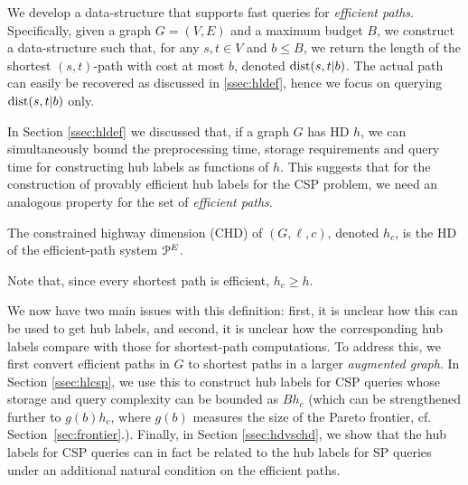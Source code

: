 We develop a data-structure that supports fast queries for \emph{efficient paths}. 
Specifically, given a graph $G=(V,E)$ and a maximum budget $B$, we construct a data-structure such that, for any $s,t\in V$ and $b\leq B$, we return the length of the shortest $(s,t)$-path with cost at most $b$, denoted $\mbox{dist}(s,t|b)$.
The actual path can easily be recovered as discussed in \cref{ssec:hldef}, hence we focus on querying $\mbox{dist}(s,t|b)$ only.

In Section \ref{ssec:hldef} we discussed that, if a graph $G$ has HD $h$, we can simultaneously bound the preprocessing time, storage requirements and query time for constructing hub labels as functions of $h$.
This suggests that for the construction of provably efficient hub labels for the CSP problem, we need an analogous property for the set of \emph{efficient paths}.
\begin{definition} The constrained highway dimension (CHD) of $(G,\ell,c)$, denoted $h_c$, is the HD of the efficient-path system $\mathcal{P}^E$.
\end{definition}
Note that, since every shortest path is efficient, $h_c\geq h$.

We now have two main issues with this definition: first, it is unclear how this can be used to get hub labels, and second, it is unclear how the corresponding hub labels compare with those for shortest-path computations. 
To address this, we first convert efficient paths in $G$ to shortest paths in a larger \emph{augmented graph}. 
In Section \ref{ssec:hlcsp}, we use this to construct hub labels for CSP queries whose storage and query complexity can be bounded as $Bh_c$ (which can be strengthened further to $g(b)h_c$, where $g(b)$ measures the size of the Pareto frontier, cf. Section~\ref{sec:frontier}.). 
Finally, in Section \ref{ssec:hdvschd}, we show that the hub labels for CSP queries can in fact be related to the hub labels for SP queries under an additional natural condition on the efficient paths.